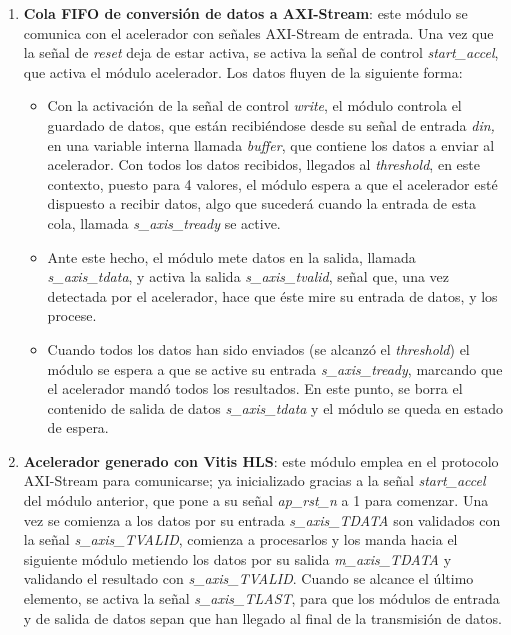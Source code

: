 \begin{enumerate}
    \item \textbf{Cola FIFO de conversión de datos a AXI-Stream}: este módulo se comunica con el acelerador con señales AXI-Stream de entrada. Una vez que la señal de \emph{reset} deja de estar activa, se activa la señal de control \emph{start\_accel}, que activa el módulo acelerador. Los datos fluyen de la siguiente forma: 
    
    \begin{itemize}
        \item Con la activación de la señal de control \emph{write}, el módulo controla el guardado de datos, que están recibiéndose desde su señal de entrada \emph{din, }en una variable interna llamada \textit{buffer}, que contiene los datos a enviar al acelerador. Con todos los datos recibidos, llegados al \textit{threshold}, en este contexto, puesto para 4 valores, el módulo espera a que el acelerador esté dispuesto a recibir datos, algo que sucederá cuando la entrada de esta cola, llamada \emph{s\_axis\_tready} se active. 
        
        \item Ante este hecho, el módulo mete datos en la salida, llamada \emph{s\_axis\_tdata}, y activa la salida \emph{s\_axis\_tvalid}, señal que, una vez detectada por el acelerador, hace que éste mire su entrada de datos, y los procese. 
        
        \item Cuando todos los datos han sido enviados (se alcanzó el \textit{threshold}) el módulo se espera a que se active su entrada \emph{s\_axis\_tready}, marcando que el acelerador mandó todos los resultados. En este punto, se borra el contenido de salida de datos \emph{s\_axis\_tdata} y el módulo se queda en estado de espera.
    \end{itemize}

    \item \textbf{Acelerador generado con Vitis HLS}: este módulo emplea en el protocolo AXI-Stream para comunicarse; ya inicializado gracias a la señal \emph{start\_accel} del módulo anterior, que pone a su señal \emph{ap\_rst\_n} a 1 para comenzar. Una vez se comienza a los datos por su entrada \emph{s\_axis\_TDATA} son validados con la señal \emph{s\_axis\_TVALID}, comienza a procesarlos y los manda hacia el siguiente módulo metiendo los datos por su salida \emph{m\_axis\_TDATA} y validando el resultado con \emph{s\_axis\_TVALID}. Cuando se alcance el último elemento, se activa la señal \emph{s\_axis\_TLAST}, para que los módulos de entrada y de salida de datos sepan que han llegado al final de la transmisión de datos. 
    

\end{enumerate}
